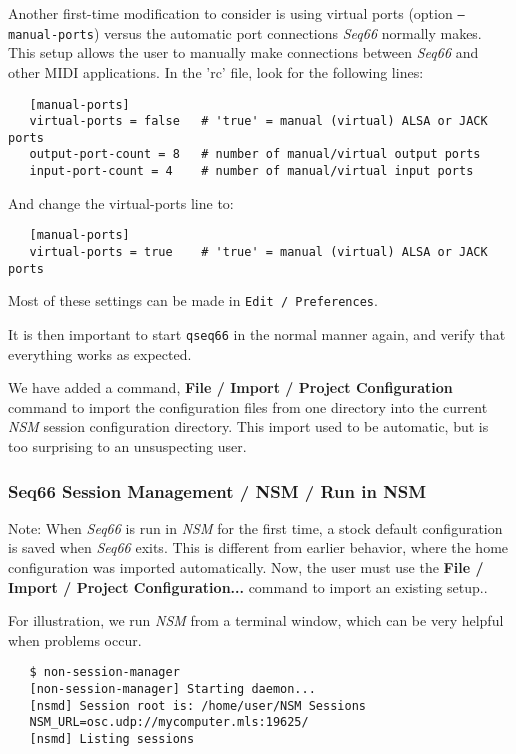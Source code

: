    Another first-time modification to consider is using virtual ports (option
   \texttt{--manual-ports}) versus the automatic port connections
   \textsl{Seq66} normally makes.
   This setup allows the user to manually make connections between
   \textsl{Seq66} and other MIDI applications.
   In the 'rc' file, look for the following lines:

\begin{verbatim}
   [manual-ports]
   virtual-ports = false   # 'true' = manual (virtual) ALSA or JACK ports
   output-port-count = 8   # number of manual/virtual output ports
   input-port-count = 4    # number of manual/virtual input ports
\end{verbatim}

   And change the virtual-ports line to:

\begin{verbatim}
   [manual-ports]
   virtual-ports = true    # 'true' = manual (virtual) ALSA or JACK ports
\end{verbatim}

   Most of these settings can be made in \texttt{Edit / Preferences}.

   It is then important to start \texttt{qseq66} in the normal manner again,
   and verify that everything works as expected.

   We have added a command, \textbf{File / Import / Project Configuration}
   command to import the configuration files from one directory into the
   current \textsl{NSM} session configuration directory.
   This import used to be automatic, but is too surprising to an unsuspecting
   user.

\subsubsection{Seq66 Session Management / NSM / Run in NSM}
\label{subsec:sessions_nsm_first_run_in_nsm}

   Note: When \textsl{Seq66} is run in \textsl{NSM} for the first time,
   a stock default configuration is saved when
   \textsl{Seq66} exits.
   This is different from earlier behavior, where the home configuration was
   imported automatically.
   Now, the user must use the
   \textbf{File / Import / Project Configuration...}
   command to import an existing setup..

   For illustration, we run \textsl{NSM} from a terminal window, which can be
   very helpful when problems occur.

\begin{verbatim}
   $ non-session-manager
   [non-session-manager] Starting daemon...
   [nsmd] Session root is: /home/user/NSM Sessions
   NSM_URL=osc.udp://mycomputer.mls:19625/
   [nsmd] Listing sessions
\end{verbatim}

